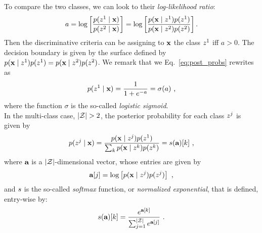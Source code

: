 To compare the two classes, we can look to their \emph{log-likelihood ratio}:
\begin{equation}\label{eq:log-ratio}
a = \log\left[\frac{p(z^1\mid \textbf{x})}{p(z^2\mid \textbf{x})}\right] =  \log\left[\frac{p(\textbf{x}\mid z^1)p(z^1)}{p(\textbf{x}\mid z^2)p(z^2)}\right].
\end{equation}
Then the discriminative criteria can be assigning to $\textbf{x}$ the class $z^1$ iff $a>0$. The decision boundary is given by the surface defined by $p(\textbf{x}\mid z^1)p(z^1) = p(\textbf{x}\mid z^2)p(z^2)$.
We remark that we Eq.~\eqref{eq:post_probs} rewrites as
\begin{equation}\label{eq:post_probs_sigmoid}
p(z^1\mid \textbf{x}) = \frac{1}{1+e^{-a}} = \sigma(a)\mbox{ ,}
\end{equation}
where the function $\sigma$ is the so-called \emph{logistic sigmoid}.\\
In the multi-class case, \ie $\lvert\mathcal{Z}\rvert >2$, the posterior probability for each class $z^j$ is given by
\begin{equation}\label{eq:post_probs_multi-class}
p(z^j\mid \textbf{x}) = \frac{p(\textbf{x}\mid z^j)p(z^1)}{\sum_kp(\textbf{x}\mid z^k)p(z^k )} = s (\textbf{a})[k]\mbox{ ,}
\end{equation}
where $\textbf{a}$ is a $\lvert\mathcal{Z}\rvert$-dimensional vector, whose entries are given by
\begin{equation}
\textbf{a}[j] = \log\left[ p(\textbf{x}\mid z^j)p(z^j) \right] \mbox{ ,}
\end{equation}
and $s$ is the so-called \emph{softmax} function, or \emph{normalized exponential}, that is defined, entry-wise by:
\begin{equation}\label{eq:softmax}
s(\textbf{a})[k] = \frac{e^{\textbf{a}[k]}}{\sum_{j=1}^{\lvert\mathcal{Z}\rvert}e^{\textbf{a}[j]}}\mbox{ .}
\end{equation}

